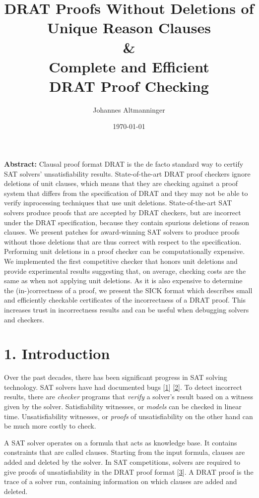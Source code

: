 \documentclass[
]{report}
\title{
    DRAT Proofs Without Deletions of \\ Unique Reason Clauses \\
    \&\\
    Complete and Efficient \\ DRAT Proof Checking
}
\author{Johannes Altmanninger}
\date{\today}
\begin{document}
\maketitle

\textbf{Abstract:} Clausal proof format DRAT is the de facto standard
way to certify SAT solvers' unsatisfiability results. State-of-the-art
DRAT proof checkers ignore deletions of unit clauses, which means that
they are checking against a proof system that differs from the
specification of DRAT and they may not be able to verify inprocessing
techniques that use unit deletions. State-of-the-art SAT solvers produce
proofs that are accepted by DRAT checkers, but are incorrect under the
DRAT specification, because they contain spurious deletions of reason
clauses. We present patches for award-winning SAT solvers to produce
proofs without those deletions that are thus correct with respect to the
specification. Performing unit deletions in a proof checker can be
computationally expensive. We implemented the first competitive checker
that honors unit deletions and provide experimental results suggesting
that, on average, checking costs are the same as when not applying unit
deletions. As it is also expensive to determine the (in-)correctness of
a proof, we present the SICK format which describes small and
efficiently checkable certificates of the incorrectness of a DRAT proof.
This increases trust in incorrectness results and can be useful when
debugging solvers and checkers.

\tableofcontents

\hypertarget{introduction}{%
\chapter{1. Introduction}\label{introduction}}

Over the past decades, there has been significant progress in SAT
solving technology. SAT solvers have had documented bugs
{[}\protect\hyperlink{ref-BrummayerBiere-SMT09}{1}{]}
{[}\protect\hyperlink{ref-DBLP:confux2fsatux2fBrummayerLB10}{2}{]}. To
detect incorrect results, there are \emph{checker} programs that
\emph{verify} a solver's result based on a witness given by the solver.
Satisfiability witnesses, or \emph{models} can be checked in linear
time. Unsatisfiability witnesses, or \emph{proofs} of unsatisfiability
on the other hand can be much more costly to check.

A SAT solver operates on a formula that acts as knowledge base. It
contains constraints that are called clauses. Starting from the input
formula, clauses are added and deleted by the solver. In SAT
competitions, solvers are required to give proofs of unsatisfiability in
the DRAT proof format
{[}\protect\hyperlink{ref-DBLP:journalsux2fstvrux2fHeuleHW14}{3}{]}. A
DRAT proof is the trace of a solver run, containing information on which
clauses are added and deleted.
\end{document}
